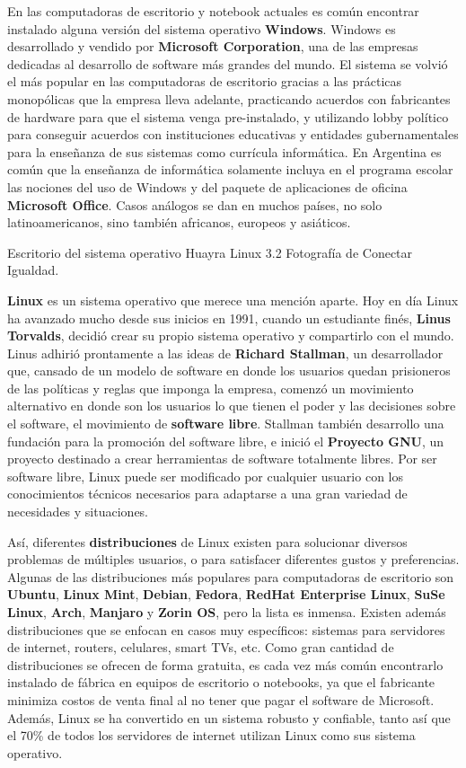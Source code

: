 En las computadoras de escritorio y notebook actuales es común encontrar instalado
alguna versión del sistema operativo \textbf{Windows}. Windows
es desarrollado y vendido por \textbf{Microsoft Corporation}, una de las empresas
dedicadas al desarrollo de software más grandes del mundo. El sistema se volvió
el más popular en las computadoras de escritorio gracias a las prácticas
monopólicas que la empresa lleva adelante, practicando acuerdos con fabricantes
de hardware para que el sistema venga pre-instalado, y utilizando lobby político
para conseguir acuerdos con instituciones educativas y entidades gubernamentales
para la enseñanza de sus sistemas como currícula informática. En Argentina es
común que la enseñanza de informática solamente incluya en el programa escolar
las nociones del uso de Windows y del paquete de aplicaciones de oficina
\textbf{Microsoft Office}. Casos análogos se dan en muchos países, no solo
latinoamericanos, sino también africanos, europeos y asiáticos.\autocite{lenard_1999}

{Escritorio del sistema operativo Huayra Linux 3.2}
{Fotografía de Conectar Igualdad.}

\textbf{Linux} es un sistema operativo que merece una mención aparte. Hoy en día
Linux ha avanzado mucho desde sus inicios en 1991, cuando un estudiante finés,
\textbf{Linus Torvalds}, decidió crear su propio sistema operativo y compartirlo
con el mundo. Linus adhirió prontamente a las ideas de \textbf{Richard Stallman},
un desarrollador que, cansado de un modelo de software en donde los usuarios
quedan prisioneros de las políticas y reglas que imponga la empresa, comenzó un
movimiento alternativo en donde son los usuarios lo que tienen el poder y las
decisiones sobre el software, el movimiento de \textbf{software libre}. Stallman
también desarrollo una fundación para la promoción del software libre, e inició
el \textbf{Proyecto GNU}, un proyecto destinado a crear herramientas de software totalmente
libres. Por ser software libre, Linux puede ser modificado por cualquier usuario
con los conocimientos técnicos necesarios para adaptarse a una gran variedad de
necesidades y situaciones.

Así, diferentes \textbf{distribuciones} de Linux
existen para solucionar diversos problemas de múltiples usuarios, o para satisfacer
diferentes gustos y preferencias. Algunas de las distribuciones más populares
para computadoras de escritorio son \textbf{Ubuntu}, \textbf{Linux Mint},
\textbf{Debian}, \textbf{Fedora}, \textbf{RedHat Enterprise Linux},
\textbf{SuSe Linux}, \textbf{Arch}, \textbf{Manjaro} y \textbf{Zorin OS}, pero
la lista es inmensa. Existen además distribuciones que se enfocan en casos muy
específicos: sistemas para servidores de internet, routers, celulares, smart TVs,
etc. Como gran cantidad de distribuciones se ofrecen de forma gratuita, es cada
vez más común encontrarlo instalado de fábrica en equipos de escritorio o
notebooks, ya que el fabricante minimiza costos de venta final al
no tener que pagar el software de Microsoft. Además, Linux se ha convertido
en un sistema robusto y confiable, tanto así que el 70\% de todos los servidores
de internet utilizan Linux como sus sistema operativo.

